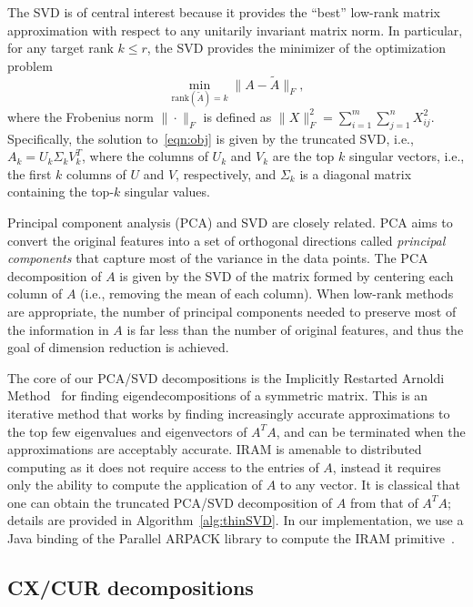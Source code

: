 The SVD is of central interest because it provides the ``best'' low-rank matrix
approximation with respect to any unitarily invariant matrix norm.  In
particular, for any target rank $k \leq r$, the SVD provides the minimizer of
the optimization problem
\begin{equation}
 \label{eqn:obj}
  \min_{\text{rank}(\tilde A) = k} \| A - \tilde A \|_F,
\end{equation}
where the Frobenius norm $\| \cdot \|_F$ is defined as $\|X\|_F^2 =
\sum_{i=1}^m \sum_{j=1}^n X_{ij}^2 $. Specifically, the solution
to~\eqref{eqn:obj} is given by the truncated SVD, i.e., $A_k = U_k \Sigma_k
V_k^T$, where the columns of $U_k$ and $V_k$ are the top $k$ singular vectors,
i.e., the first $k$ columns of $U$ and $V$, respectively, and $\Sigma_k$ is a 
diagonal matrix containing the top-$k$ singular values.

Principal component analysis (PCA) and SVD are closely related.  PCA aims to
convert the original features into a set of orthogonal directions called {\it
principal components} that capture most of the variance in the data points.
The PCA decomposition of $A$ is given by the SVD of the matrix formed by
centering each column of $A$ (i.e., removing the mean of each column).  When
low-rank methods are appropriate, the number of principal components needed to
preserve most of the information in $A$ is far less than the number of original
features, and thus the goal of dimension reduction is achieved.

The core of our PCA/SVD decompositions is the Implicitly Restarted Arnoldi Method~\cite{ArpackUserGuide}
for finding eigendecompositions of a symmetric matrix.  This is an iterative
method that works by finding increasingly accurate approximations to the top
few eigenvalues and eigenvectors of $A^TA$, and can be terminated when the
approximations are acceptably accurate. IRAM is amenable to distributed
computing as it does not require access to the entries of $A$, instead it
requires only the ability to compute the application of $A$ to any vector. It is 
classical that one can obtain the truncated PCA/SVD decomposition of $A$ from that of $A^TA;$
details are provided in Algorithm~\ref{alg:thinSVD}. In our implementation, we use a Java binding of the 
Parallel ARPACK library to compute the IRAM primitive~\cite{maschho1996portable}.

\subsection{CX/CUR decompositions}

